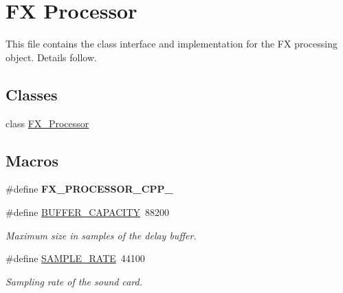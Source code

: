 \hypertarget{group__fx}{\section{F\+X Processor}
\label{group__fx}
}


This file contains the class interface and implementation for the F\+X processing object. Details follow.  


\subsection*{Classes}
\begin{DoxyCompactItemize}
\item 
class \hyperlink{class_f_x___processor}{F\+X\+\_\+\+Processor}
\end{DoxyCompactItemize}
\subsection*{Macros}
\begin{DoxyCompactItemize}
\item 
\hypertarget{group__fx_ga7814ab808e89cbde6ae474e691d7c6ea}{\#define {\bfseries F\+X\+\_\+\+P\+R\+O\+C\+E\+S\+S\+O\+R\+\_\+\+C\+P\+P\+\_\+}}\label{group__fx_ga7814ab808e89cbde6ae474e691d7c6ea}

\item 
\hypertarget{group__fx_ga473776433ac44bc525b8cd5186969b4b}{\#define \hyperlink{group__fx_ga473776433ac44bc525b8cd5186969b4b}{B\+U\+F\+F\+E\+R\+\_\+\+C\+A\+P\+A\+C\+I\+T\+Y}~88200}\label{group__fx_ga473776433ac44bc525b8cd5186969b4b}

\begin{DoxyCompactList}\small\item\em Maximum size in samples of the delay buffer. \end{DoxyCompactList}\item 
\hypertarget{group__fx_ga4b76a0c2859cfd819a343a780070ee2b}{\#define \hyperlink{group__fx_ga4b76a0c2859cfd819a343a780070ee2b}{S\+A\+M\+P\+L\+E\+\_\+\+R\+A\+T\+E}~44100}\label{group__fx_ga4b76a0c2859cfd819a343a780070ee2b}

\begin{DoxyCompactList}\small\item\em Sampling rate of the sound card. \end{DoxyCompactList}\end{DoxyCompactItemize}
